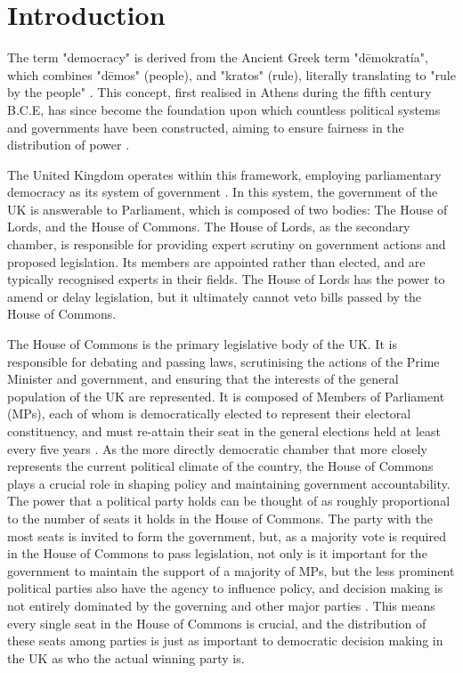 \documentclass{article}
\begin{document}
\section{Introduction}
The term "democracy" is derived from the Ancient Greek term "dēmokratía", which combines "dēmos" (people), and "kratos" (rule), 
literally translating to "rule by the people" \cite{democracy}. This concept, first realised in Athens during the fifth century B.C.E, has since become the
foundation upon which countless political systems and governments have been constructed, aiming to ensure fairness in the distribution of power \cite{natgeo}.

The United Kingdom operates within this framework, employing parliamentary democracy as its system of government \cite{parldem}. In this system, the government of
the UK is answerable to Parliament, which is composed of two bodies: The House of Lords, and the House of Commons. The House of Lords, as the secondary chamber,
is responsible for providing expert scrutiny on government actions and proposed legislation. Its members are appointed rather than elected, and are typically 
recognised experts in their fields. The House of Lords has the power to amend or delay legislation, but it ultimately cannot veto bills passed by the House of 
Commons.

The House of Commons is the primary legislative body of the UK. It is responsible for debating and passing laws, scrutinising the actions of the Prime Minister
and government, and ensuring that the interests of the general population of the UK are represented. It is composed of Members of Parliament (MPs), each of
whom is democratically elected to represent their electoral constituency, and must re-attain their seat in the general elections held at least every five
years \cite{generalelections}. As the more directly democratic chamber that more closely represents the current political climate of the country, the House of Commons plays a crucial
role in shaping policy and maintaining government accountability. The power that a political party holds can be thought of as roughly proportional to the
number of seats it holds in the House of Commons. The party with the most seats is invited to form the government, but, as a majority vote is required in the
House of Commons to pass legislation, not only is it important for the government to maintain the support of a majority of MPs, but the less prominent political
parties also have the agency to influence policy, and decision making is not entirely dominated by the governing and other major parties \cite{divisions}.
This means every single seat in the House of Commons is crucial, and the distribution of these seats among parties is just as important to democratic decision making in the UK
as who the actual winning party is.
\end{document}
